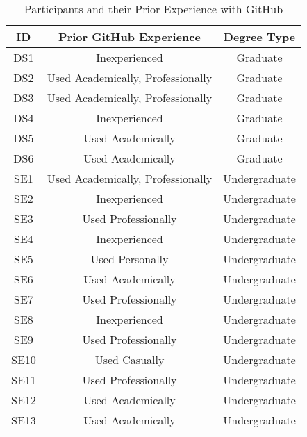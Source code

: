 \begin{table}[h]
    \vspace{1pt}
        \caption{Participants and their Prior Experience with GitHub}\label{table:interviews:students}
    \vspace{1pt}
    \begin{center}
        \begin{tabular}{c | c | c}
            \hline
            ID & Prior GitHub Experience & Degree Type \\
            \hline
            DS1 & Inexperienced & Graduate \\ \hline
            DS2 & Used Academically, Professionally & Graduate \\ \hline
            DS3 & Used Academically, Professionally & Graduate \\ \hline
            DS4 & Inexperienced & Graduate \\ \hline
            DS5 & Used Academically & Graduate \\ \hline
            DS6 & Used Academically & Graduate \\ \hline
            SE1 & Used Academically, Professionally & Undergraduate \\ \hline
            SE2 & Inexperienced & Undergraduate \\ \hline
            SE3 & Used Professionally & Undergraduate \\ \hline
            SE4 & Inexperienced & Undergraduate \\ \hline
            SE5 & Used Personally & Undergraduate \\ \hline
            SE6 & Used Academically & Undergraduate \\ \hline
            SE7 & Used Professionally & Undergraduate \\ \hline
            SE8 & Inexperienced & Undergraduate \\ \hline
            SE9 & Used Professionally & Undergraduate \\ \hline
            SE10 & Used Casually & Undergraduate \\ \hline
            SE11 & Used Professionally & Undergraduate \\ \hline
            SE12 & Used Academically & Undergraduate \\ \hline
            SE13 & Used Academically & Undergraduate \\ \hline
        \end{tabular}
    \end{center}
\end{table}

